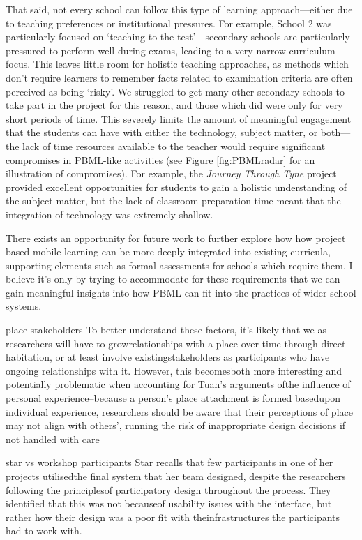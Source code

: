 That said, not every school can follow this type of learning approach---either due to teaching preferences or institutional pressures. For example, School 2 was particularly focused on `teaching to the test'---secondary schools are particularly pressured to perform well during exams, leading to a very narrow curriculum focus. This leaves little room for holistic teaching approaches, as methods which don't require learners to remember facts related to examination criteria are often perceived as being `risky'. We struggled to get many other secondary schools to take part in the project for this reason, and those which did were only for very short periods of time. This severely limits the amount of meaningful engagement that the students can have with either the technology, subject matter, or both---the lack of time resources available to the teacher would require significant compromises in PBML-like activities (see Figure \ref{fig:PBMLradar} for an illustration of compromises). For example, the \textit{Journey Through Tyne} project provided excellent opportunities for students to gain a holistic understanding of the subject matter, but the lack of classroom preparation time meant that the integration of technology was extremely shallow.

There exists an opportunity for future work to further explore how how project based mobile learning can be more deeply integrated into existing curricula, supporting elements such as formal assessments for schools which require them. I believe it's only by trying to accommodate for these requirements that we can gain meaningful insights into how PBML can fit into the practices of wider school systems. 



place stakeholders
To better understand these factors, it’s likely that we as researchers will have to growrelationships with a place over time through direct habitation, or at least involve existingstakeholders as participants who have ongoing relationships with it. However, this becomesboth more interesting and potentially problematic when accounting for Tuan’s arguments ofthe influence of personal experience–because a person’s place attachment is formed basedupon individual experience, researchers should be aware that their perceptions of place may not align with others’, running the risk of inappropriate design decisions if not handled with care

star vs workshop participants
Star recalls that few participants in one of her projects utilisedthe final system that her team designed, despite the researchers following the principlesof participatory design throughout the process.  They identified that this was not becauseof usability issues with the interface, but rather how their design was a poor fit with theinfrastructures the participants had to work with. 

